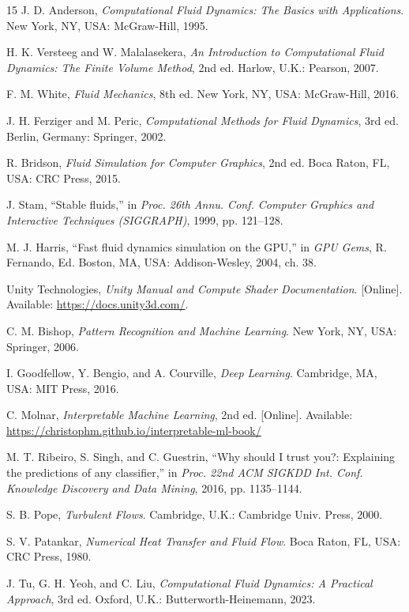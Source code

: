 \documentclass[12pt,a4paper,titlepage]{report}
\begin{document}
\begin{thebibliography}{15}
J. D. Anderson,
\textit{Computational Fluid Dynamics: The Basics with Applications}.
New York, NY, USA: McGraw-Hill, 1995.

H. K. Versteeg and W. Malalasekera,
\textit{An Introduction to Computational Fluid Dynamics: The Finite Volume Method}, 2nd ed.
Harlow, U.K.: Pearson, 2007.

F. M. White,
\textit{Fluid Mechanics}, 8th ed.
New York, NY, USA: McGraw-Hill, 2016.

J. H. Ferziger and M. Peric,
\textit{Computational Methods for Fluid Dynamics}, 3rd ed.
Berlin, Germany: Springer, 2002.

R. Bridson,
\textit{Fluid Simulation for Computer Graphics}, 2nd ed.
Boca Raton, FL, USA: CRC Press, 2015.

J. Stam, ``Stable fluids,'' in \textit{Proc. 26th Annu. Conf. Computer Graphics and Interactive Techniques (SIGGRAPH)}, 1999, pp. 121--128.

M. J. Harris, ``Fast fluid dynamics simulation on the GPU,'' in \textit{GPU Gems}, R. Fernando, Ed.
Boston, MA, USA: Addison-Wesley, 2004, ch. 38.

Unity Technologies,
\textit{Unity Manual and Compute Shader Documentation}. [Online]. Available:
\url{https://docs.unity3d.com/}.

C. M. Bishop,
\textit{Pattern Recognition and Machine Learning}.
New York, NY, USA: Springer, 2006.

I. Goodfellow, Y. Bengio, and A. Courville,
\textit{Deep Learning}.
Cambridge, MA, USA: MIT Press, 2016.

C. Molnar,
\textit{Interpretable Machine Learning}, 2nd ed.
[Online]. Available: \url{https://christophm.github.io/interpretable-ml-book/}

M. T. Ribeiro, S. Singh, and C. Guestrin, ``Why should I trust you?: Explaining the predictions of any classifier,'' in \textit{Proc. 22nd ACM SIGKDD Int. Conf. Knowledge Discovery and Data Mining}, 2016, pp. 1135--1144.

S. B. Pope,
\textit{Turbulent Flows}.
Cambridge, U.K.: Cambridge Univ. Press, 2000.

S. V. Patankar,
\textit{Numerical Heat Transfer and Fluid Flow}.
Boca Raton, FL, USA: CRC Press, 1980.

J. Tu, G. H. Yeoh, and C. Liu,
\textit{Computational Fluid Dynamics: A Practical Approach}, 3rd ed.
Oxford, U.K.: Butterworth-Heinemann, 2023.
\end{thebibliography}
\end{document}

